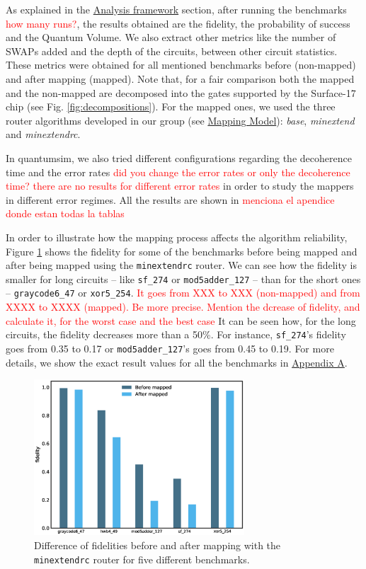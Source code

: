 As explained in the \href{chapter-4.org}{Analysis framework} section, after running the benchmarks \textcolor{red}{how many runs?}, the results obtained are the fidelity, the probability of success and the Quantum Volume.
We also extract other metrics like the number of SWAPs added and the depth of the circuits, between other circuit statistics.
These metrics were obtained for all mentioned benchmarks before (non-mapped) and after mapping (mapped). Note that, for a fair comparison both the mapped and the non-mapped are  decomposed into the gates supported by  the Surface-17 chip (see Fig. \ref{fig:decompositions}). For the mapped ones, we used the three router algorithms developed in our group (see \hyperref[sec:org19dc500]{Mapping Model}): \textit{base}, \textit{minextend} and \textit{minextendrc}. 


In quantumsim, we also tried different configurations regarding the decoherence time and the error rates \textcolor{red}{did you change the error rates or only the decoherence time? there are no results for different error rates} in order to study the mappers in different error regimes.
All the results are shown in \textcolor{red}{menciona el apendice donde estan todas la tablas}


In order to illustrate how the mapping process affects the algorithm reliability, Figure \ref{fig:f_diff_bar_plot} shows the fidelity for some of the benchmarks before being mapped and after being mapped using the \texttt{minextendrc} router.
We can see how the fidelity is smaller for long circuits -- like \texttt{sf\_274} or \texttt{mod5adder\_127} -- than for the short ones -- \texttt{graycode6\_47} or \texttt{xor5\_254}. \textcolor{red}{It goes from XXX to XXX (non-mapped) and from XXXX to XXXX (mapped).}
\textcolor{red}{Be more precise. Mention the dcrease of fidelity, and calculate it, for the worst case and the best case} It can be seen how, for the long circuits, the fidelity decreases more than a 50\%.
For instance, \texttt{sf\_274}'s fidelity goes from 0.35 to 0.17 or \texttt{mod5adder\_127}'s goes from 0.45 to 0.19.
For more details, we show the exact result values for all the benchmarks in \href{appendix-1.org}{Appendix A}.

\begin{figure}[htbp]
\centering
\includegraphics[width=0.7\textwidth]{figures/f_diff_bar_plot.eps}
\caption{\label{fig:f_diff_bar_plot}
Difference of fidelities before and after mapping with the \texttt{minextendrc} router for five different benchmarks.}
\end{figure}

